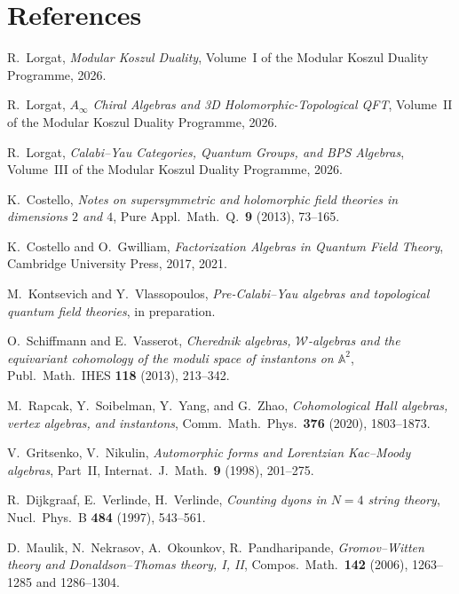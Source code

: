 \documentclass[11pt]{article}
\theoremstyle{plain}
\theoremstyle{definition}
\theoremstyle{remark}
\newcommand{\cW}{\mathcal{W}}
\newcommand{\Ainf}{A_\infty}
\begin{document}

\section*{References}

\begin{enumerate}[label={[\arabic*]}]
\item
 R.~Lorgat,
 \emph{Modular Koszul Duality},
 Volume~I of the Modular Koszul Duality Programme, 2026.

\item
 R.~Lorgat,
 \emph{$\Ainf$ Chiral Algebras and 3D Holomorphic-Topological QFT},
 Volume~II of the Modular Koszul Duality Programme, 2026.

\item
 R.~Lorgat,
 \emph{Calabi--Yau Categories, Quantum Groups, and BPS Algebras},
 Volume~III of the Modular Koszul Duality Programme, 2026.

\item
 K.~Costello,
 \emph{Notes on supersymmetric and holomorphic field theories in
 dimensions $2$ and $4$},
 Pure Appl.\ Math.\ Q.\ \textbf{9} (2013), 73--165.

\item
 K.~Costello and O.~Gwilliam,
 \emph{Factorization Algebras in Quantum Field Theory},
 Cambridge University Press, 2017, 2021.

\item
 M.~Kontsevich and Y.~Vlassopoulos,
 \emph{Pre-Calabi--Yau algebras and topological quantum field
 theories}, in preparation.

\item
 O.~Schiffmann and E.~Vasserot,
 \emph{Cherednik algebras, $\cW$-algebras and the equivariant
 cohomology of the moduli space of instantons on $\mathbb{A}^2$},
 Publ.\ Math.\ IHES \textbf{118} (2013), 213--342.

\item
 M.~Rapcak, Y.~Soibelman, Y.~Yang, and G.~Zhao,
 \emph{Cohomological Hall algebras, vertex algebras, and
 instantons},
 Comm.\ Math.\ Phys.\ \textbf{376} (2020), 1803--1873.

\item
 V.~Gritsenko, V.~Nikulin,
 \emph{Automorphic forms and Lorentzian Kac--Moody algebras},
 Part~II, Internat.\ J.\ Math.\ \textbf{9} (1998), 201--275.

\item
 R.~Dijkgraaf, E.~Verlinde, H.~Verlinde,
 \emph{Counting dyons in $N=4$ string theory},
 Nucl.\ Phys.\ B \textbf{484} (1997), 543--561.

\item
 D.~Maulik, N.~Nekrasov, A.~Okounkov, R.~Pandharipande,
 \emph{Gromov--Witten theory and Donaldson--Thomas theory, I, II},
 Compos.\ Math.\ \textbf{142} (2006), 1263--1285 and 1286--1304.
\end{enumerate}
\end{document}
